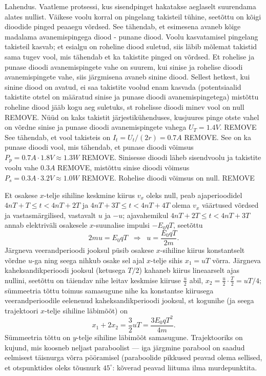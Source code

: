 \documentclass[10pt]{article}
\newcommand{\pp}[1]{REMOVE}
\begin{document}
\solu
Lahendus. Vaatleme protsessi, kus sisendpinget hakatakse aeglaselt suurendama alates nullist. Väikese voolu korral on pingelang takisteil tühine, seetõttu on kõigi dioodide pinged peaaegu võrdsed. See tähendab, et esimesena avaneb kõige madalama avanemispingega diood - punane diood. Voolu kasvatamisel pingelang takisteil kasvab; et esialgu on roheline diood suletud, siis läbib mõlemat takistid sama tugev vool, mis tähendab et ka takistite pinged on võrdsed. Et rohelise ja punase dioodi avanemispingete vahe on suurem, kui sinise ja rohelise dioodi avanemispingete vahe, siis järgmisena avaneb sinine diood. Sellest hetkest, kui sinine diood on avatud, ei saa takistite voolud enam kasvada (potentsiaalid takistite otstel on määratud sinise ja punase dioodi avanemispingetega) mistõttu roheline diood jääb kogu aeg suletuks, st rohelisse dioodi minev vool on null \pp{3}. Nüüd on kaks takistit järjestikühenduses, kusjuures pinge otste vahel on võrdne sinise ja punase dioodi avanemispingete vahega $U_T=\SI{1.4}V$. \pp{2} See tähendab, et vool takisteis on $I_t=U_t/(2r)=\SI{0.7}A$ \pp{2}. See on ka punase dioodi vool, mis tähendab, et punase dioodi võimsus $P_p=\SI{0.7}A\cdot \SI{1.8}V\approx {1.3}W$ \pp{1}. Sinisesse dioodi läheb sisendvoolu ja takistite voolu vahe $\SI{0.3}A$ \pp{2}, mistõttu sinise dioodi võimsus $P_s=\SI{0.3}A\cdot \SI{3.2}V\approx {1.0}W$ \pp{1}. Rohelise dioodi võimsus on null. \pp{1}
\probend
\bigskip

\setAuthor{}

\solu
Et osakese $x$-telje sihiline keskmine kiirus $v_x$ oleks null, peab ajaperioodidel $4nT+T\le t < 4nT+2T$ ja  $4nT+3T\le t < 4nT+4T$ olema $v_x$ väärtused võrdsed ja vastasmärgilised, vastavalt $u$ ja $-u$; ajavahemikul $4nT+2T\le t < 4nT+3T$ annab elektriväli osakesele $x$-suunalise impulsi $-E_0qT$, seetõttu
$$2mu=E_0qT \;\;\Rightarrow\;\; u=\frac{E_0qT}{2m}.$$
Järgneva veerandperioodi jooksul püsib osakese $x$-sihiline kiirus konstantselt võrdne $u$-ga ning seega nihkub osake sel ajal $x$-telje sihis $x_1=uT$ võrra. Järgneva kaheksandikperioodi jooksul (ketusega $T/2$) kahaneb kiirus lineaarselt ajas nullini, seetõttu on täiendav nihe leitav keskmise kiiruse $\frac u2$ abil, $x_2=\frac u2\cdot \frac T2=uT/4$; sümmeetria tõttu toimus samasugune nihe ka konstantse kiirusega veerandperioodile eelenenud kaheksandikperioodi jooksul, st kogunihe (ja seega trajektoori $x$-telje sihiline läbimõõt) on $$x_1+2x_2=\frac32 uT=\frac{3E_0qT^2}{4m}.$$
Sümmeetria tõttu on $y$-telje sihiline läbimõõt samasugune. Trajektooriks on kujund, mis koosneb neljast paraboolist --- iga järgmine parabool on saadud eelmisest täisnurga võrra pööramisel (paraboolide pikkused peavad olema sellised, et otspunktides oleks tõusnurk $45^\circ$: kõverad peavad liituma ilma murdepunktita.
\end{document}
